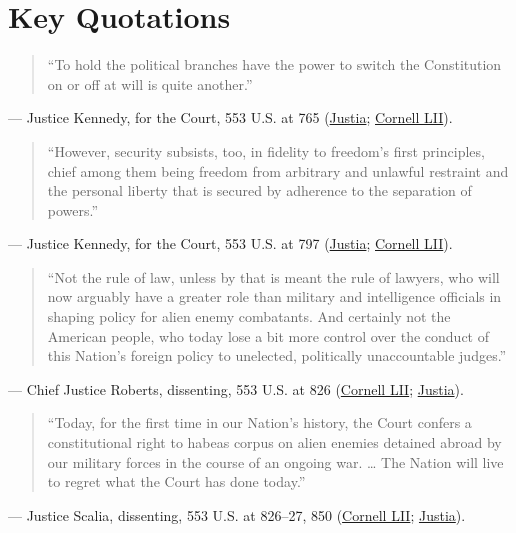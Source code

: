 \documentclass[12pt]{article}
\begin{document}
\section{Key Quotations}
\begin{quote}
``To hold the political branches have the power to switch the Constitution on or off at will is quite another.''
\end{quote}
\noindent --- Justice Kennedy, for the Court, 553 U.S. at 765 (\href{https://supreme.justia.com/cases/federal/us/553/723/}{Justia}; \href{https://www.law.cornell.edu/supct/html/06-1195.ZO.html}{Cornell LII}).

\begin{quote}
``However, security subsists, too, in fidelity to freedom's first principles, chief among them being freedom from arbitrary and unlawful restraint and the personal liberty that is secured by adherence to the separation of powers.''
\end{quote}
\noindent --- Justice Kennedy, for the Court, 553 U.S. at 797 (\href{https://supreme.justia.com/cases/federal/us/553/723/}{Justia}; \href{https://www.law.cornell.edu/supct/html/06-1195.ZS.html}{Cornell LII}).

\begin{quote}
``Not the rule of law, unless by that is meant the rule of lawyers, who will now arguably have a greater role than military and intelligence officials in shaping policy for alien enemy combatants. And certainly not the American people, who today lose a bit more control over the conduct of this Nation's foreign policy to unelected, politically unaccountable judges.''
\end{quote}
\noindent --- Chief Justice Roberts, dissenting, 553 U.S. at 826 (\href{https://www.law.cornell.edu/supct/html/06-1195.ZD.html}{Cornell LII}; \href{https://supreme.justia.com/cases/federal/us/553/723/}{Justia}).

\begin{quote}
``Today, for the first time in our Nation's history, the Court confers a constitutional right to habeas corpus on alien enemies detained abroad by our military forces in the course of an ongoing war. \ldots{} The Nation will live to regret what the Court has done today.''
\end{quote}
\noindent --- Justice Scalia, dissenting, 553 U.S. at 826--27, 850 (\href{https://www.law.cornell.edu/supct/html/06-1195.ZD1.html}{Cornell LII}; \href{https://supreme.justia.com/cases/federal/us/553/723/}{Justia}).
\end{document}
